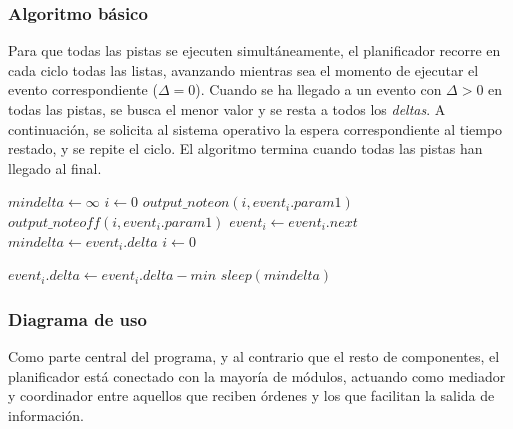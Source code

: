 \subsubsection{Algoritmo básico}

Para que todas las pistas se ejecuten simultáneamente, el planificador recorre en cada ciclo todas las listas, avanzando mientras sea el momento de ejecutar el evento correspondiente ($\Delta=0$). Cuando se ha llegado a un evento con $\Delta > 0$ en todas las pistas, se busca el menor valor y se resta a todos los \textit{deltas}. A continuación, se solicita al sistema operativo la espera correspondiente al tiempo restado, y se repite el ciclo. El algoritmo termina cuando todas las pistas han llegado al final.

\smallskip

\begin{algorithmic}
	\LOOP
		\STATE $mindelta \gets \infty$
		\STATE $i\gets 0$
					\STATE $output\_noteon(i, event_i.param1)$
				\ELSE 
						\STATE $output\_noteoff (i, event_i.param1)$
					\ENDIF
				\ENDIF
				\STATE $event_i \gets event_i.next$
			\ENDWHILE
				\STATE $mindelta \gets event_i.delta$
			\ENDIF
		\ENDWHILE
		\STATE $i \gets 0$
		
			\STATE $event_i.delta \gets event_i.delta - min$
		\ENDWHILE
		\STATE $sleep (mindelta)$
	\ENDLOOP
\end{algorithmic}

\smallskip

\subsubsection{Diagrama de uso}

Como parte central del programa, y al contrario que el resto de componentes, el planificador está conectado con la mayoría de módulos, actuando como mediador y coordinador entre aquellos que reciben órdenes y los que facilitan la salida de información.

\smallskip

